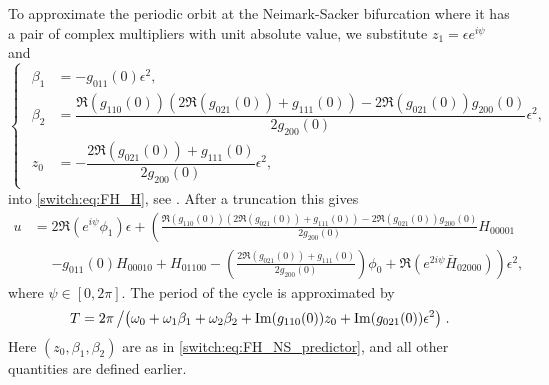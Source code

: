 To approximate the periodic orbit at the Neimark-Sacker bifurcation where it has a pair of complex multipliers with unit absolute value, we substitute $z_{1}=\epsilon e^{i\psi}$ and 
\begin{equation}
\begin{cases}
\begin{aligned}
\beta_{1} & =-g_{011}(0)\epsilon^{2},\\
\beta_{2} & =\dfrac{\Re(g_{110}(0))\left(2\Re(g_{021}(0))+g_{111}(0)\right)-2\Re(g_{021}(0))g_{200}(0)}{2g_{200}(0)}\epsilon^{2}, \\
z_0&=-\dfrac{2\Re\left(g_{021}(0)\right)+g_{111}(0)}{2g_{200}(0)}\epsilon^{2},
\end{aligned}
\end{cases}\label{switch:eq:FH_NS_predictor}
\end{equation}
into \cref{switch:eq:FH_H}, see \cite{Kuznetsov2008}. After a truncation this gives
\begin{align*}
u & =2\Re\left(e^{i\psi}\phi_{1}\right)\epsilon+\left(\frac{\Re(g_{110}(0))\left(2\Re(g_{021}(0))+g_{111}(0)\right)-2\Re(g_{021}(0))g_{200}(0)}{2g_{200}(0)}H_{00001} \right. \\
	& \phantom{=} \left. -g_{011}(0)H_{00010}+H_{01100}-\left(\frac{2\Re(g_{021}(0))+g_{111}(0)}{2g_{200}(0)}\right)\phi_{0}+\Re\left(e^{2i\psi}\bar{H}_{02000}\right)\right)\epsilon^{2},
\end{align*}
where $\psi \in [0,2\pi]$. The period of the cycle is approximated by
\[
T =2\pi\left/\left(\omega_0+\omega_{1}\beta_{1}+\omega_{2}\beta_{2}+\Im(g_{110}(0))z_{0}+\Im(g_{021}(0))\epsilon^{2}\right)\right..
\]
Here $(z_{0},\beta_{1},\beta_{2})$ are as in \cref{switch:eq:FH_NS_predictor}, and all other quantities are defined earlier.

